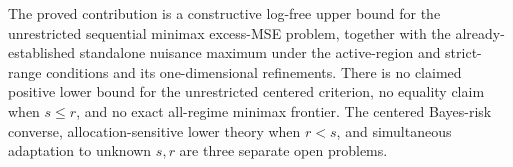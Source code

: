 The proved contribution is a constructive log-free upper bound for the unrestricted sequential minimax excess-MSE problem, together with the already-established standalone nuisance maximum under the active-region and strict-range conditions and its one-dimensional refinements.  There is no claimed positive lower bound for the unrestricted centered criterion, no equality claim when \(s\leq r\), and no exact all-regime minimax frontier.  The centered Bayes-risk converse, allocation-sensitive lower theory when \(r<s\), and simultaneous adaptation to unknown \(s,r\) are three separate open problems.